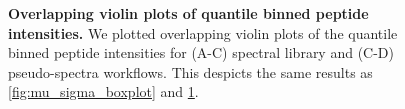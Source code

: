 \documentclass[11pt]{article}
\begin{document}
\begin{figure}[hbt]
\begin{tabular}{lclc}
    \end{tabular}
  \caption{{\bf Overlapping violin plots of quantile binned peptide intensities.} We plotted overlapping violin plots of the quantile binned peptide intensities for (A-C) spectral library and (C-D) pseudo-spectra workflows. This despicts the same results as \ref{fig:mu_sigma_boxplot} and \ref{fig:mu_sigma_KDE}. \label{fig:mu_sigma_KDE}} 
\end{figure}
\end{document}
